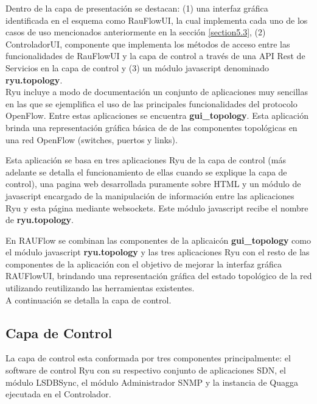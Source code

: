 Dentro de la capa de presentaci\'on se destacan: (1) una interfaz gr\'afica identificada en el esquema como RauFlowUI, la cual implementa cada uno de los casos de uso mencionados anteriormente en la secci\'on \ref{section5.3}, (2) ControladorUI, componente que implementa los m\'etodos de acceso entre las funcionalidades de RauFlowUI y la capa de control a trav\'es de una API Rest de Servicios en la capa de control y (3) un m\'odulo javascript denominado \textbf{ryu.topology}.\\ 

Ryu incluye a modo de documentaci\'on un conjunto de aplicaciones muy sencillas en las que se ejemplifica el uso de las principales funcionalidades del protocolo OpenFlow. Entre estas aplicaciones se encuentra \textbf{gui\_topology}. Esta aplicaci\'on brinda una representaci\'on gr\'afica b\'asica de de las componentes topol\'ogicas en una red OpenFlow (switches, puertos y links).

Esta aplicaci\'on se basa en tres aplicaciones Ryu de la capa de control (m\'as adelante se detalla el funcionamiento de ellas cuando se explique la capa de control), una pagina web desarrollada puramente sobre HTML y un m\'odulo de javascript encargado de la manipulaci\'on de informaci\'on entre las aplicaciones Ryu y esta p\'agina mediante websockets. Este m\'odulo javascript recibe el nombre de \textbf{ryu.topology}.

En RAUFlow se combinan las componentes de la aplicaic\'on \textbf{gui\_topology} como el m\'odulo javascript \textbf{ryu.topology} y las tres aplicaciones Ryu con el resto de las componentes de la aplicaci\'on con el objetivo de mejorar la interfaz gr\'afica RAUFlowUI, brindando una representaci\'on gr\'afica del estado topol\'ogico de la red utilizando reutilizando las herramientas existentes.\\
 
A continuaci\'on se detalla la capa de control.

\subsection{Capa de Control}

La capa de control esta conformada por tres componentes principalmente: el software de control Ryu con su respectivo conjunto de aplicaciones SDN, el m\'odulo LSDBSync, el m\'odulo Administrador SNMP y la instancia de Quagga ejecutada en el Controlador.\\

 
